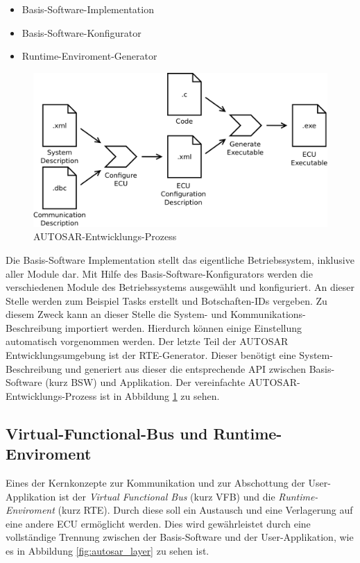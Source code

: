 \documentclass[
  a4paper,					    %
  twoside,
  DIV=calc,     				%
  bibliography=totoc,
  cleardoublepage=empty,
  ngerman,     					%
  final       					%
]{scrbook}
\begin{document}
\begin{itemize}
    \item Basis-Software-Implementation
    \item Basis-Software-Konfigurator
    \item Runtime-Enviroment-Generator
\end{itemize}

\begin{figure}[ht]
    \centering
    \includegraphics[width=1\textwidth]{Autosar_Prozess}
    \caption{AUTOSAR-Entwicklungs-Prozess}
    \label{fig:autosar_prozess}
\end{figure}

Die Basis-Software Implementation stellt das eigentliche Betriebssystem, inklusive aller Module dar. Mit Hilfe des Basis-Software-Konfigurators werden die verschiedenen Module des Betriebssystems ausgewählt und konfiguriert. An dieser Stelle werden zum Beispiel Tasks erstellt und Botschaften-IDs vergeben. Zu diesem Zweck kann an dieser Stelle die System- und Kommunikations-Beschreibung importiert werden. Hierdurch können einige Einstellung automatisch vorgenommen werden. Der letzte Teil der AUTOSAR Entwicklungsumgebung ist der RTE-Generator. Dieser benötigt eine System-Beschreibung und generiert aus dieser die entsprechende API zwischen Basis-Software (kurz BSW) und Applikation. Der vereinfachte AUTOSAR-Entwicklungs-Prozess ist in Abbildung \ref{fig:autosar_prozess} zu sehen.



\subsection{Virtual-Functional-Bus und Runtime-Enviroment}
\label{sec:vfb}
Eines der Kernkonzepte zur Kommunikation und zur Abschottung der User-Applikation ist der \emph{Virtual Functional Bus} (kurz VFB) und die \emph{Runtime-Enviroment} (kurz RTE). Durch diese soll ein Austausch und eine Verlagerung auf eine andere ECU ermöglicht werden. Dies wird gewährleistet durch eine vollständige Trennung zwischen der Basis-Software und der User-Applikation, wie es in Abbildung \ref{fig:autosar_layer} zu sehen ist. 
\end{document}
